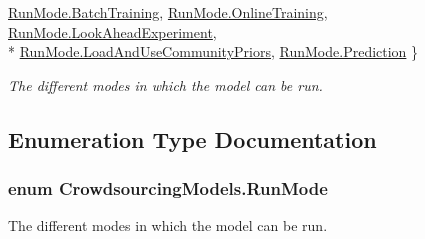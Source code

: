 \begin{DoxyCompactItemize}
\hyperlink{namespace_crowdsourcing_models_ac2299b85781ea82aa2c8850723c8a063a7b487b1f767aedc4203de4188aac7d0f}{Run\+Mode.\+Batch\+Training}, 
\hyperlink{namespace_crowdsourcing_models_ac2299b85781ea82aa2c8850723c8a063ad7be9344e693b609adcee347febe075e}{Run\+Mode.\+Online\+Training}, 
\hyperlink{namespace_crowdsourcing_models_ac2299b85781ea82aa2c8850723c8a063a14bdf8e8251e892826ae8fce56c028df}{Run\+Mode.\+Look\+Ahead\+Experiment}, 
\\*
\hyperlink{namespace_crowdsourcing_models_ac2299b85781ea82aa2c8850723c8a063aaf5e8790a70d645b4800b6b901301f56}{Run\+Mode.\+Load\+And\+Use\+Community\+Priors}, 
\hyperlink{namespace_crowdsourcing_models_ac2299b85781ea82aa2c8850723c8a063a3964d4f40b6166aa9d370855bd20f662}{Run\+Mode.\+Prediction}
 \}\begin{DoxyCompactList}\small\item\em The different modes in which the model can be run. \end{DoxyCompactList}
\end{DoxyCompactItemize}


\subsection{Enumeration Type Documentation}
\hypertarget{namespace_crowdsourcing_models_ac2299b85781ea82aa2c8850723c8a063}{}
\subsubsection[{Run\+Mode}]{\setlength{\rightskip}{0pt plus 5cm}enum {\bf Crowdsourcing\+Models.\+Run\+Mode}\hspace{0.3cm}{\ttfamily [strong]}}\label{namespace_crowdsourcing_models_ac2299b85781ea82aa2c8850723c8a063}


The different modes in which the model can be run. 

